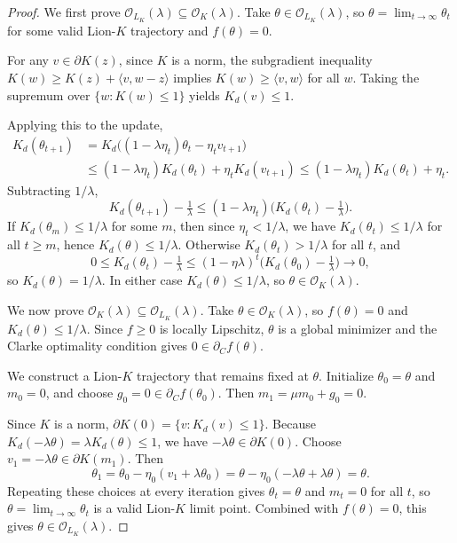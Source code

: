 \documentclass{article}
\begin{document}
\begin{proof}
We first prove $\mathcal{O}_{L_K}(\lambda) \subseteq \mathcal{O}_K(\lambda)$. Take $\theta \in \mathcal{O}_{L_K}(\lambda)$, so $\theta = \lim_{t \to \infty} \theta_t$ for some valid Lion-$K$ trajectory and $f(\theta) = 0$.

For any $v \in \partial K(z)$, since $K$ is a norm, the subgradient inequality $K(w) \ge K(z) + \langle v, w - z \rangle$ implies $K(w) \ge \langle v, w \rangle$ for all $w$. Taking the supremum over $\{w : K(w) \le 1\}$ yields $K_d(v) \le 1$.

Applying this to the update,
\begin{align*}
K_d(\theta_{t+1})
&= K_d\!\bigl((1 - \lambda \eta_t) \theta_t - \eta_t v_{t+1}\bigr) \\
&\le (1 - \lambda \eta_t) K_d(\theta_t) + \eta_t K_d(v_{t+1})
\le (1 - \lambda \eta_t) K_d(\theta_t) + \eta_t.
\end{align*}
Subtracting $1/\lambda$,
\[
K_d(\theta_{t+1}) - \tfrac{1}{\lambda}
\le (1 - \lambda \eta_t)\bigl( K_d(\theta_t) - \tfrac{1}{\lambda} \bigr).
\]
If $K_d(\theta_m) \le 1/\lambda$ for some $m$, then since $\eta_t < 1/\lambda$, we have $K_d(\theta_t) \le 1/\lambda$ for all $t \ge m$, hence $K_d(\theta) \le 1/\lambda$. Otherwise $K_d(\theta_t) > 1/\lambda$ for all $t$, and
\[
0 \le K_d(\theta_t) - \tfrac{1}{\lambda} \le (1 - \eta\lambda)^t \bigl(K_d(\theta_0) - \tfrac{1}{\lambda}\bigr) \to 0,
\]
so $K_d(\theta) = 1/\lambda$. In either case $K_d(\theta) \le 1/\lambda$, so $\theta \in \mathcal{O}_K(\lambda)$.

We now prove $\mathcal{O}_K(\lambda) \subseteq \mathcal{O}_{L_K}(\lambda)$. Take $\theta \in \mathcal{O}_K(\lambda)$, so $f(\theta) = 0$ and $K_d(\theta) \le 1/\lambda$. Since $f \ge 0$ is locally Lipschitz, $\theta$ is a global minimizer and the Clarke optimality condition \citep{clarke1990optimization} gives $0 \in \partial_C f(\theta)$.

We construct a Lion-$K$ trajectory that remains fixed at $\theta$. Initialize $\theta_0 = \theta$ and $m_0 = 0$, and choose $g_0 = 0 \in \partial_C f(\theta_0)$. Then $m_1 = \mu m_0 + g_0 = 0$.

Since $K$ is a norm, $\partial K(0) = \{v : K_d(v) \le 1\}$. Because $K_d(-\lambda \theta) = \lambda K_d(\theta) \le 1$, we have $-\lambda \theta \in \partial K(0)$. Choose $v_1 = -\lambda \theta \in \partial K(m_1)$. Then
\[
\theta_1 = \theta_0 - \eta_0 (v_1 + \lambda \theta_0) = \theta - \eta_0 (-\lambda \theta + \lambda \theta) = \theta.
\]
Repeating these choices at every iteration gives $\theta_t = \theta$ and $m_t = 0$ for all $t$, so $\theta = \lim_{t \to \infty} \theta_t$ is a valid Lion-$K$ limit point. Combined with $f(\theta) = 0$, this gives $\theta \in \mathcal{O}_{L_K}(\lambda)$.
\end{proof}
\end{document}
